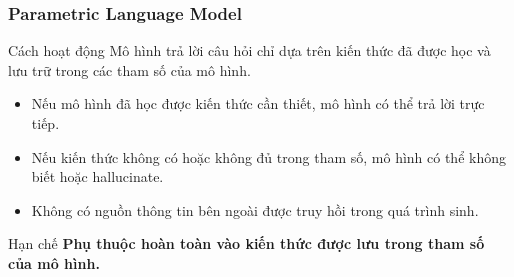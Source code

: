
\begin{frame}
    \frametitle{Parametric Language Model}

    \begin{block}{Cách hoạt động}
        Mô hình trả lời câu hỏi chỉ dựa trên kiến thức đã được
        học và lưu trữ trong các tham số của mô hình.
    \end{block}

    \vspace{0.3cm}

    \begin{center}
    \end{center}

    \vspace{0.3cm}

    \begin{itemize}
        \item Nếu mô hình đã học được kiến thức cần thiết,
        mô hình có thể trả lời trực tiếp.

        \item Nếu kiến thức không có hoặc không đủ trong tham số,
        mô hình có thể không biết hoặc hallucinate.

        \item Không có nguồn thông tin bên ngoài được truy hồi
        trong quá trình sinh.
    \end{itemize}

    \begin{block}{Hạn chế}
        \centering
        \textbf{Phụ thuộc hoàn toàn vào kiến thức được lưu trong
        tham số của mô hình.}
    \end{block}

\end{frame}


